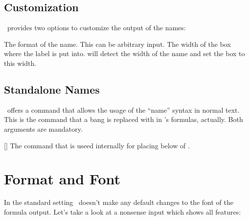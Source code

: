 \documentclass[load-preamble+]{cnltx-doc}
\begin{document}
\subsection{Customization}
\chemformula\ provides two options to customize the output of the names:
\begin{options}
   The format of the name.  This can be arbitrary input.
   The width of the box where the label is put into.   will detect
   the width of the name and set the box to this width.
\end{options}
\begin{example}
   \par
   \par
   \par
\end{example}

\subsection{Standalone Names}
\chemformula\ offers a command that allows the usage of the
\enquote{name} syntax in normal text.  This is the command that a bang is
replaced with in \chemformula's formulas, actually.  Both arguments are
mandatory.
\begin{commands}
  []
    The command that is useed internally for placing   below of
    .
\end{commands}

\section{Format and Font}\label{sec:format}
In the standard setting \chemformula\ doesn't make any default changes to the
font of the formula output.  Let's take a look at a nonsense input which shows
all features:
\begin{example}[pre-output={\biolinumLF\libertineLF\setchemformula{format=}}]
  \newcommand*\sample{%
  }
  \sample
\end{example}
\newcommand*\sample{%
  \ch{H2C-C+C-CH=CH+ + CrO4^2-
      <=>[x][y]
    2.5 Cl^{-.} + 3_1/2 Na*OH_{(aq)} + !(name)( A^n ) "\LaTeXe"}
}
\end{document}
